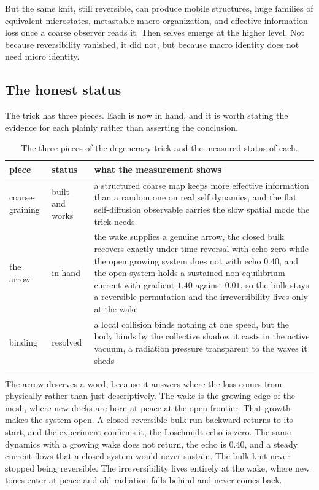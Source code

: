 But the same knit, still reversible, can produce mobile structures, huge families of equivalent microstates, metastable macro organization, and effective information loss once a coarse observer reads it. Then selves emerge at the higher level. Not because reversibility vanished, it did not, but because macro identity does not need micro identity.

\subsection{The honest status}

The trick has three pieces. Each is now in hand, and it is worth stating the evidence for each plainly rather than asserting the conclusion.

\begin{table}[ht]
\centering
\begin{tabular}{@{}p{}p{}p{}@{}}
\toprule
piece & status & what the measurement shows \\
\midrule
coarse-graining & built and works & a structured coarse map keeps more effective information than a random one on real self dynamics, and the flat self-diffusion observable carries the slow spatial mode the trick needs \\
the arrow & in hand & the wake supplies a genuine arrow, the closed bulk recovers exactly under time reversal with echo zero while the open growing system does not with echo $0.40$, and the open system holds a sustained non-equilibrium current with gradient $1.40$ against $0.01$, so the bulk stays a reversible permutation and the irreversibility lives only at the wake \\
binding & resolved & a local collision binds nothing at one speed, but the body binds by the collective shadow it casts in the active vacuum, a radiation pressure transparent to the waves it sheds \\
\bottomrule
\end{tabular}
\caption{The three pieces of the degeneracy trick and the measured status of each.}
\label{tab:trick-status}
\end{table}

The arrow deserves a word, because it answers where the loss comes from physically rather than just descriptively. The wake is the growing edge of the mesh, where new docks are born at peace at the open frontier. That growth makes the system open. A closed reversible bulk run backward returns to its start, and the experiment confirms it, the Loschmidt echo is zero. The same dynamics with a growing wake does not return, the echo is $0.40$, and a steady current flows that a closed system would never sustain. The bulk knit never stopped being reversible. The irreversibility lives entirely at the wake, where new tones enter at peace and old radiation falls behind and never comes back.

